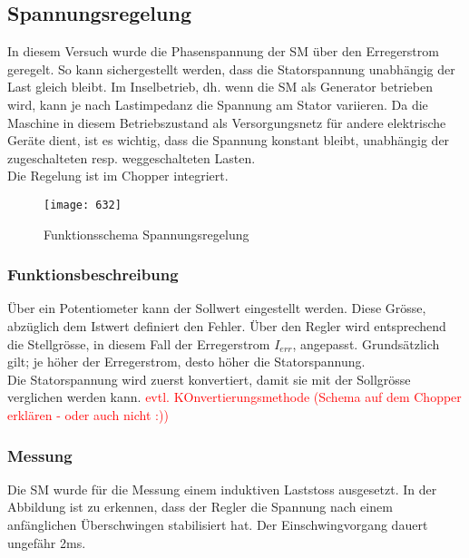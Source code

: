 \begin{flushleft}
\newpage
\subsection{Spannungsregelung}

In diesem Versuch wurde die Phasenspannung der SM über den Erregerstrom geregelt. So kann sichergestellt werden, dass die Statorspannung unabhängig der Last gleich bleibt.
Im Inselbetrieb, dh. wenn die SM als Generator betrieben wird, kann je nach Lastimpedanz die Spannung am Stator variieren. Da die Maschine in diesem Betriebszustand als Versorgungsnetz für andere elektrische Geräte dient, ist es wichtig, dass die Spannung konstant bleibt, unabhängig der zugeschalteten resp. weggeschalteten Lasten.\\
Die Regelung ist im Chopper integriert. \\

\vspace{0.3cm}



\begin{figure}[H]
    \centering
        \texttt{[image: 632]}
    \caption{Funktionsschema Spannungsregelung}
    \label{fig:abb1}
\end{figure}



\subsubsection{Funktionsbeschreibung}
\vspace{0.3cm}
Über ein Potentiometer kann der Sollwert eingestellt werden. Diese Grösse, abzüglich dem Istwert definiert den Fehler. Über den Regler wird entsprechend die Stellgrösse, in diesem Fall der Erregerstrom $I_{err}$, angepasst. Grundsätzlich gilt; je höher der Erregerstrom, desto höher die Statorspannung. \\
Die Statorspannung wird zuerst konvertiert, damit sie mit der Sollgrösse verglichen werden kann.
\textcolor{red}{evtl. KOnvertierungsmethode (Schema auf dem Chopper erklären - oder auch nicht :))}

\newpage


\subsubsection{Messung}
Die SM wurde für die Messung einem induktiven Laststoss ausgesetzt. In der Abbildung ist zu erkennen, dass der Regler die Spannung nach einem anfänglichen Überschwingen stabilisiert hat. Der Einschwingvorgang dauert ungefähr 2ms.\\


\end{flushleft}
